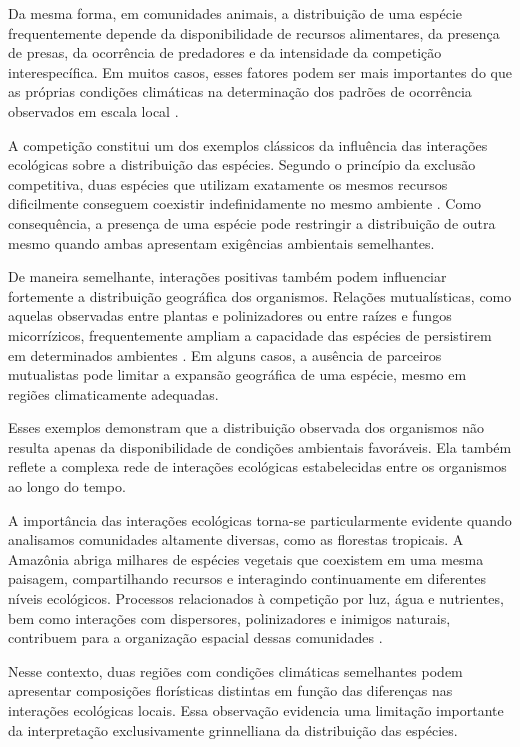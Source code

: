 Da mesma forma, em comunidades animais, a distribuição de uma espécie frequentemente depende da disponibilidade de recursos alimentares, da presença de presas, da ocorrência de predadores e da intensidade da competição interespecífica. Em muitos casos, esses fatores podem ser mais importantes do que as próprias condições climáticas na determinação dos padrões de ocorrência observados em escala local \parencite{begon2006,ricklefs2010}.

A competição constitui um dos exemplos clássicos da influência das interações ecológicas sobre a distribuição das espécies. Segundo o princípio da exclusão competitiva, duas espécies que utilizam exatamente os mesmos recursos dificilmente conseguem coexistir indefinidamente no mesmo ambiente \parencite{gause1934}. Como consequência, a presença de uma espécie pode restringir a distribuição de outra mesmo quando ambas apresentam exigências ambientais semelhantes.

De maneira semelhante, interações positivas também podem influenciar fortemente a distribuição geográfica dos organismos. Relações mutualísticas, como aquelas observadas entre plantas e polinizadores ou entre raízes e fungos micorrízicos, frequentemente ampliam a capacidade das espécies de persistirem em determinados ambientes \parencite{bronstein1994}. Em alguns casos, a ausência de parceiros mutualistas pode limitar a expansão geográfica de uma espécie, mesmo em regiões climaticamente adequadas.

Esses exemplos demonstram que a distribuição observada dos organismos não resulta apenas da disponibilidade de condições ambientais favoráveis. Ela também reflete a complexa rede de interações ecológicas estabelecidas entre os organismos ao longo do tempo.

A importância das interações ecológicas torna-se particularmente evidente quando analisamos comunidades altamente diversas, como as florestas tropicais. A Amazônia abriga milhares de espécies vegetais que coexistem em uma mesma paisagem, compartilhando recursos e interagindo continuamente em diferentes níveis ecológicos. Processos relacionados à competição por luz, água e nutrientes, bem como interações com dispersores, polinizadores e inimigos naturais, contribuem para a organização espacial dessas comunidades \parencite{terborgh2012,levin2013}.

Nesse contexto, duas regiões com condições climáticas semelhantes podem apresentar composições florísticas distintas em função das diferenças nas interações ecológicas locais. Essa observação evidencia uma limitação importante da interpretação exclusivamente grinnelliana da distribuição das espécies.

